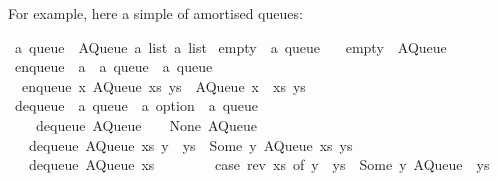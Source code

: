 \begin{isabellebody}
\begin{isamarkuptext}
  For example, here a simple  of amortised queues:%
\end{isamarkuptext}%
\isamarkuptrue%
%
\isadelimquote
%
\endisadelimquote
%
\isatagquote
{}\isamarkupfalse%
\ {\isacharprime}a\ queue\ {\isacharequal}\ AQueue\ {\isachardoublequoteopen}{\isacharprime}a\ list{\isachardoublequoteclose}\ {\isachardoublequoteopen}{\isacharprime}a\ list{\isachardoublequoteclose}\isanewline
\isanewline
{}\isamarkupfalse%
\ empty\ {\isacharcolon}{\isacharcolon}\ {\isachardoublequoteopen}{\isacharprime}a\ queue{\isachardoublequoteclose}\ \isanewline
\ \ {\isachardoublequoteopen}empty\ {\isacharequal}\ AQueue\ {\isacharbrackleft}{\isacharbrackright}\ {\isacharbrackleft}{\isacharbrackright}{\isachardoublequoteclose}\isanewline
\isanewline
{}\isamarkupfalse%
\ enqueue\ {\isacharcolon}{\isacharcolon}\ {\isachardoublequoteopen}{\isacharprime}a\ {\isasymRightarrow}\ {\isacharprime}a\ queue\ {\isasymRightarrow}\ {\isacharprime}a\ queue{\isachardoublequoteclose}\ \isanewline
\ \ {\isachardoublequoteopen}enqueue\ x\ {\isacharparenleft}AQueue\ xs\ ys{\isacharparenright}\ {\isacharequal}\ AQueue\ {\isacharparenleft}x\ {\isacharhash}\ xs{\isacharparenright}\ ys{\isachardoublequoteclose}\isanewline
\isanewline
{}\isamarkupfalse%
\ dequeue\ {\isacharcolon}{\isacharcolon}\ {\isachardoublequoteopen}{\isacharprime}a\ queue\ {\isasymRightarrow}\ {\isacharprime}a\ option\ {\isasymtimes}\ {\isacharprime}a\ queue{\isachardoublequoteclose}\ \isanewline
\ \ \ \ {\isachardoublequoteopen}dequeue\ {\isacharparenleft}AQueue\ {\isacharbrackleft}{\isacharbrackright}\ {\isacharbrackleft}{\isacharbrackright}{\isacharparenright}\ {\isacharequal}\ {\isacharparenleft}None{\isacharcomma}\ AQueue\ {\isacharbrackleft}{\isacharbrackright}\ {\isacharbrackleft}{\isacharbrackright}{\isacharparenright}{\isachardoublequoteclose}\isanewline
\ \ {\isacharbar}\ {\isachardoublequoteopen}dequeue\ {\isacharparenleft}AQueue\ xs\ {\isacharparenleft}y\ {\isacharhash}\ ys{\isacharparenright}{\isacharparenright}\ {\isacharequal}\ {\isacharparenleft}Some\ y{\isacharcomma}\ AQueue\ xs\ ys{\isacharparenright}{\isachardoublequoteclose}\isanewline
\ \ {\isacharbar}\ {\isachardoublequoteopen}dequeue\ {\isacharparenleft}AQueue\ xs\ {\isacharbrackleft}{\isacharbrackright}{\isacharparenright}\ {\isacharequal}\isanewline
\ \ \ \ \ \ {\isacharparenleft}case\ rev\ xs\ of\ y\ {\isacharhash}\ ys\ {\isasymRightarrow}\ {\isacharparenleft}Some\ y{\isacharcomma}\ AQueue\ {\isacharbrackleft}{\isacharbrackright}\ ys{\isacharparenright}{\isacharparenright}{\isachardoublequoteclose}\ %

\end{isabellebody}
